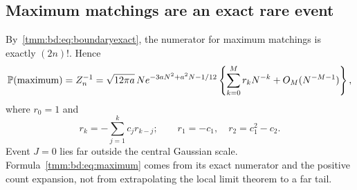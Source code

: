 \documentclass[11pt,letterpaper]{article}
\theoremstyle{remark}\newtheorem{remark}[theorem]{Remark}
\begin{document}
\subsection{Maximum matchings are an exact rare event}
By~\eqref{tmm:bd:eq:boundaryexact}, the numerator for maximum matchings is exactly $(2n)!$. Hence
\begin{equation}\label{tmm:bd:eq:maximum}
 \mathbb P(\text{maximum})=Z_n^{-1}
 =\sqrt{12\pi a}\,N e^{-3aN^2+a^2N-1/12}
   \left\{\sum_{k=0}^Mr_kN^{-k}+O_M(N^{-M-1})\right\},
\end{equation}
where $r_0=1$ and
\[
 r_k=-\sum_{j=1}^kc_jr_{k-j};\qquad r_1=-c_1,\quad r_2=c_1^2-c_2.
\]
Event $J=0$ lies far outside the central Gaussian scale. Formula~\eqref{tmm:bd:eq:maximum} comes from its exact numerator and the positive count expansion, not from extrapolating the local limit theorem to a far tail.
\end{document}
